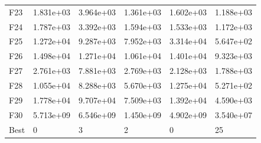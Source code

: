 \begin{tabular}{llllll}
F23  &  1.831e+03 &  3.964e+03 &  1.361e+03 &  1.602e+03 &  1.188e+03 \\
F24  &  1.787e+03 &  3.392e+03 &  1.594e+03 &  1.533e+03 &  1.172e+03 \\
F25  &  1.272e+04 &  9.287e+03 &  7.952e+03 &  3.314e+04 &  5.647e+02 \\
F26  &  1.498e+04 &  1.271e+04 &  1.061e+04 &  1.401e+04 &  9.323e+03 \\
F27  &  2.761e+03 &  7.881e+03 &  2.769e+03 &  2.128e+03 &  1.788e+03 \\
F28  &  1.055e+04 &  8.288e+03 &  5.670e+03 &  1.275e+04 &  5.271e+02 \\
F29  &  1.778e+04 &  9.707e+04 &  7.509e+03 &  1.392e+04 &  4.590e+03 \\
F30  &  5.713e+09 &  6.546e+09 &  1.450e+09 &  4.902e+09 &  3.540e+07 \\
Best &          0 &          3 &          2 &          0 &         25 \\
\bottomrule
\end{tabular}
